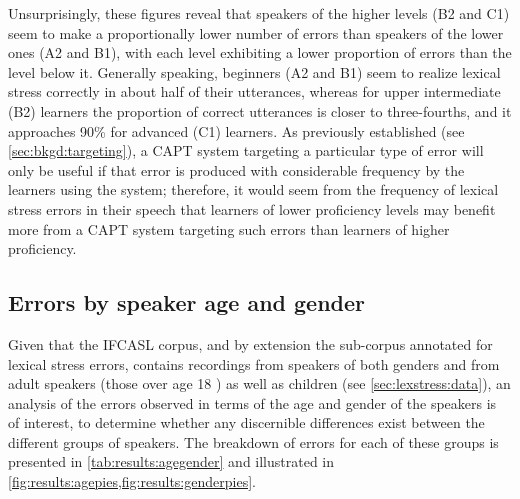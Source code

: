 			
	Unsurprisingly, these figures reveal that  speakers of the higher levels (B2 and C1) seem to make a proportionally lower number of errors than speakers of the lower ones (A2 and B1), with each level exhibiting a lower proportion of errors than the level below it. Generally speaking, beginners  (A2 and B1) seem to realize lexical stress correctly in about half of their utterances, whereas for upper intermediate (B2) learners the proportion of correct utterances is closer to three-fourths, and it approaches 90\% for advanced (C1) learners. As previously established (see \cref{sec:bkgd:targeting}), a CAPT system targeting a particular type of error will only be useful if that error is produced with considerable frequency by the learners using the system; therefore, it would seem from the frequency of lexical stress errors in their speech that learners of lower proficiency levels may benefit more from a CAPT system targeting such errors than learners of higher proficiency. 
			
			
		
		\subsection{Errors by speaker age and gender}
		\label{sec:results:agegender}
			
			
			Given that the IFCASL corpus, and by extension the sub-corpus annotated for lexical stress errors, contains recordings from speakers of both genders and from adult speakers (those over age 18 ) as well as children (see \cref{sec:lexstress:data}), an analysis of the errors observed in terms of the age and gender of the speakers is of interest, to determine whether any discernible differences exist between the different groups of speakers. The breakdown of errors for each of these groups is presented in \cref{tab:results:agegender} and illustrated in \cref{fig:results:agepies,fig:results:genderpies}.
			
